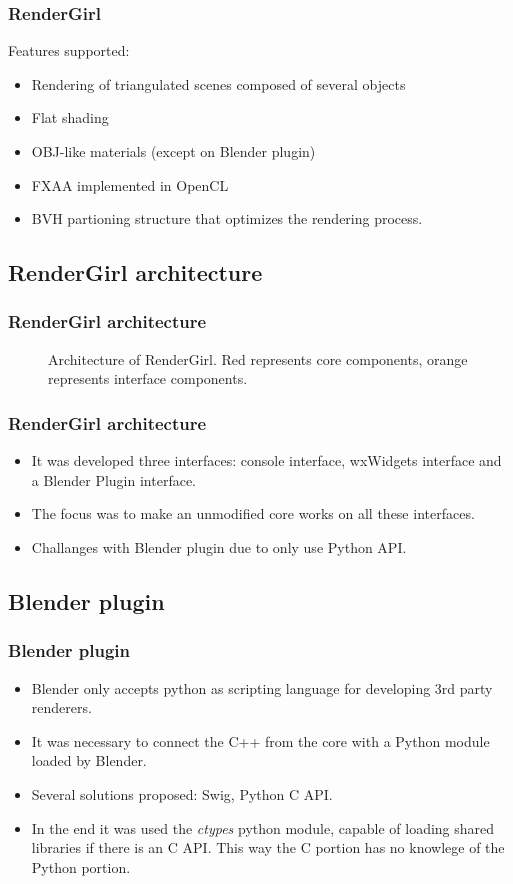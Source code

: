 \documentclass{beamer}
\begin{document}
\begin{frame}
  \frametitle{RenderGirl}

Features supported:

\begin{itemize}
\item Rendering of triangulated scenes composed of several objects
\item Flat shading
\item OBJ-like materials (except on Blender plugin)
\item FXAA implemented in OpenCL
\item BVH partioning structure that optimizes the rendering process.
\end{itemize}

\end{frame}

\subsection{RenderGirl architecture}
\begin{frame}
\frametitle{RenderGirl architecture}

\begin{figure}
\centering

\caption{Architecture of RenderGirl. Red represents core components,
  orange represents interface components.}
\label{fig:architecture}
\end{figure}

\end{frame}


\begin{frame}
\frametitle{RenderGirl architecture}
\begin{itemize}
\item It was developed three interfaces: console interface, wxWidgets
  interface and a Blender Plugin interface.
\item The focus was to make an unmodified core works on all these
  interfaces.
\item Challanges with Blender plugin due to only use Python API.
\end{itemize}
\end{frame}



\subsection{Blender plugin}
\begin{frame}
\frametitle{Blender plugin}
\begin{itemize}
\item Blender only accepts python as scripting language for developing
  3rd party renderers.
\item It was necessary to connect the C++ from the core with a Python module loaded by Blender.
\item Several solutions proposed: Swig, Python C API.
\item In the end it was used the \emph{ctypes} python module, capable
  of loading shared libraries if there is an C API. This way the C
  portion has no knowlege of the Python portion.
\end{itemize}
\end{frame}
\end{document}
